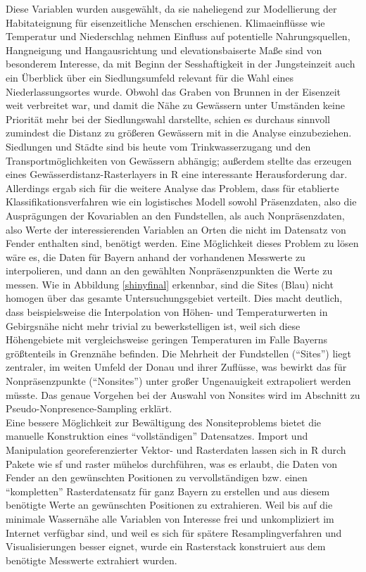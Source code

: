 Diese Variablen wurden ausgewählt, da sie naheliegend zur Modellierung der Habitateignung für eisenzeitliche Menschen erschienen. Klimaeinflüsse wie Temperatur und Niederschlag nehmen Einfluss auf potentielle Nahrungsquellen, Hangneigung und Hangausrichtung und elevationsbaiserte Maße sind von besonderem Interesse, da mit Beginn der Sesshaftigkeit in der Jungsteinzeit auch ein Überblick über ein Siedlungsumfeld relevant für die Wahl eines Niederlassungsortes wurde. \cite{sesshaft} Obwohl das Graben von Brunnen in der Eisenzeit weit verbreitet war, und damit die Nähe zu Gewässern unter Umständen keine Priorität mehr bei der Siedlungswahl darstellte, schien es durchaus sinnvoll zumindest die Distanz zu größeren Gewässern mit in die Analyse einzubeziehen. Siedlungen und Städte sind bis heute vom Trinkwasserzugang und den Transportmöglichkeiten von Gewässern abhängig; außerdem stellte das erzeugen eines Gewässerdistanz-Rasterlayers in R eine interessante Herausforderung dar. \\
Allerdings ergab sich für die weitere Analyse das Problem, dass für etablierte Klassifikationsverfahren wie ein logistisches Modell sowohl Präsenzdaten, also die Ausprägungen der Kovariablen an den Fundstellen, als auch Nonpräsenzdaten, also Werte der interessierenden Variablen an Orten die nicht im Datensatz von Fender enthalten sind, benötigt werden. Eine Möglichkeit dieses Problem zu lösen wäre es, die Daten für Bayern anhand der vorhandenen Messwerte zu interpolieren, und dann an den gewählten Nonpräsenzpunkten die Werte zu messen. Wie in Abbildung \ref{shinyfinal} erkennbar, sind die Sites (Blau) nicht homogen über das gesamte Untersuchungsgebiet verteilt. Dies macht deutlich, dass beispielsweise die Interpolation von Höhen- und Temperaturwerten in Gebirgsnähe nicht mehr trivial zu bewerkstelligen ist, weil sich diese Höhengebiete mit vergleichsweise geringen Temperaturen im Falle Bayerns größtenteils in Grenznähe befinden. Die Mehrheit der Fundstellen (``Sites'') liegt zentraler, im weiten Umfeld der Donau und ihrer Zuflüsse, was bewirkt das für Nonpräsenzpunkte (``Nonsites'') unter großer Ungenauigkeit extrapoliert werden müsste. Das genaue Vorgehen bei der Auswahl von Nonsites wird im Abschnitt zu Pseudo-Nonpresence-Sampling erklärt. \\
Eine bessere Möglichkeit zur Bewältigung des Nonsiteproblems bietet die manuelle Konstruktion eines ``vollständigen'' Datensatzes. Import und Manipulation georeferenzierter Vektor- und Rasterdaten lassen sich in R durch Pakete wie sf \cite{simplefeatures} und raster \cite{raster} mühelos durchführen, was es erlaubt, die Daten von Fender an den gewünschten Positionen zu vervollständigen bzw. einen ``kompletten'' Rasterdatensatz für ganz Bayern zu erstellen und aus diesem benötigte Werte an gewünschten Positionen zu extrahieren. Weil bis auf die minimale Wassernähe alle Variablen von Interesse frei und unkompliziert im Internet verfügbar sind, und weil es sich für spätere Resamplingverfahren und Visualisierungen besser eignet, wurde ein Rasterstack konstruiert aus dem benötigte Messwerte extrahiert wurden. 

